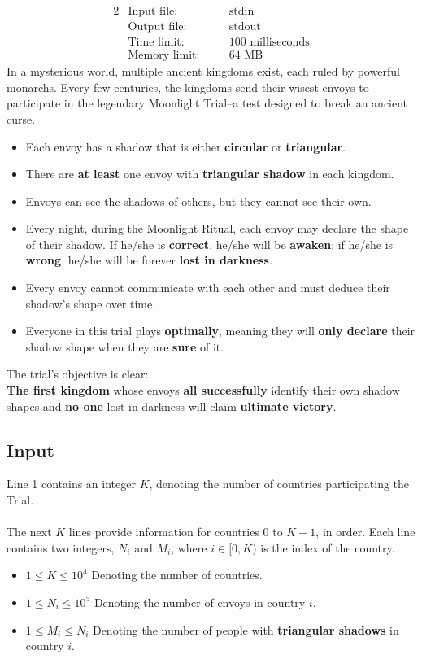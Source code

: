 \documentclass[12pt,a4paper]{article}
\begin{document}
\begin{alignat*} {2}
 &   \text{Input file:}   \quad     &&\text{stdin}\\
 &   \text{Output file:}  \quad     &&\text{stdout}\\
 &   \text{Time limit:}   \quad     &&\text{100 milliseconds}\\
 &   \text{Memory limit:} \quad     &&\text{64 MB}
\end{alignat*}
\noindent
In a mysterious world, multiple ancient kingdoms exist, each ruled by powerful monarchs. Every few centuries, the kingdoms send their wisest envoys to participate in the legendary Moonlight Trial--a test designed to break an ancient curse.
\begin{itemize}
    \item Each envoy has a shadow that is either \textbf{circular} or \textbf{triangular}.
    \item There are \textbf{at least} one envoy with \textbf{triangular shadow} in each kingdom.
    \item Envoys can see the shadows of others, but they cannot see their own.
    \item Every night, during the Moonlight Ritual, each envoy may declare the shape of their shadow. If he/she is \textbf{correct}, he/she will be \textbf{awaken}; if he/she is \textbf{wrong}, he/she will be forever \textbf{lost in darkness}.
    \item Every envoy cannot communicate with each other and must deduce their shadow's shape over time.  
    \item Everyone in this trial plays \textbf{optimally}, meaning they will \textbf{only declare} their shadow shape when they are \textbf{sure} of it.
\end{itemize}
\noindent
The trial's objective is clear:
\\
\noindent
\textbf{The first kingdom} whose envoys \textbf{all successfully} identify their own shadow shapes and \textbf{no one} lost in darkness will claim \textbf{ultimate victory}.

\subsection*{\fontsize{16}{12}Input}
Line 1 contains an integer $K$, denoting the number of countries participating the Trial.
\\\\
\noindent
The next \(K\) lines provide information for countries \(0\) to \(K-1\), in order. Each line contains two integers, \(N_i\) and \(M_i\), where \(i \in[0,K)\) is the index of the country.
\begin{itemize}
    \item $1 \leq K \leq 10^4$ Denoting the number of countries.
    \item $1 \leq N_i \leq 10^5$ Denoting the number of envoys in country \(i\).
    \item $1 \leq M_i \leq N_i$ Denoting the number of people with \textbf{triangular shadows} in country \(i\).
\end{itemize}
\end{document}
